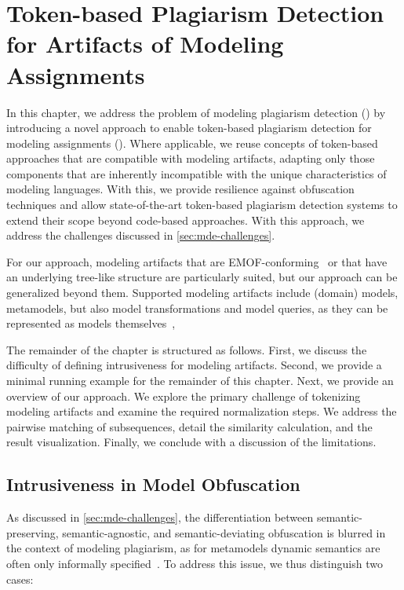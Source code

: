 \chapter[Modeling Plagiarism Detection]{Token-based Plagiarism Detection for Artifacts of Modeling Assignments}\label{sec:mde-approach}

\noindent
In this chapter, we address the problem of modeling plagiarism detection () by introducing a novel approach to enable token-based plagiarism detection for modeling assignments (). 
Where applicable, we reuse concepts of token-based approaches that are compatible with modeling artifacts, adapting only those components that are inherently incompatible with the unique characteristics of modeling languages.
With this, we provide resilience against obfuscation techniques and allow state-of-the-art token-based plagiarism detection systems to extend their scope beyond code-based approaches.
%
With this approach, we address the challenges discussed in \autoref{sec:mde-challenges}.

For our approach, modeling artifacts that are EMOF-conforming~\cite{MOF2016a} or that have an underlying tree-like structure are particularly suited, but our approach can be generalized beyond them. Supported modeling artifacts include (domain) models, metamodels, but also model transformations and model queries, as they can be represented as models themselves~\cite{Bezevin2005, Martinez2020},

The remainder of the chapter is structured as follows.
First, we discuss the difficulty of defining intrusiveness for modeling artifacts.
Second, we provide a minimal running example for the remainder of this chapter.
Next, we provide an overview of our approach. We explore the primary challenge of tokenizing modeling artifacts and examine the required normalization steps. We address the pairwise matching of subsequences, detail the similarity calculation, and the result visualization. Finally, we conclude with a discussion of the limitations.


\section{Intrusiveness in Model Obfuscation}\label{sec:mde-intrusiveness}
As discussed in \autoref{sec:mde-challenges}, the differentiation between semantic-preserving, semantic-agnostic, and semantic-deviating obfuscation is blurred in the context of modeling plagiarism, as for metamodels dynamic semantics are often only informally specified~\cite{Brambilla2017}.
To address this issue, we thus distinguish two cases: 


